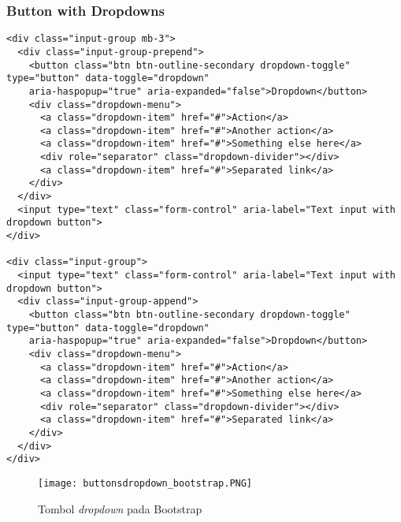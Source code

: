 \subsubsection{Button with Dropdowns}
\begin{lstlisting}[frame=single, basicstyle=\tiny]
<div class="input-group mb-3">
  <div class="input-group-prepend">
    <button class="btn btn-outline-secondary dropdown-toggle" type="button" data-toggle="dropdown"
    aria-haspopup="true" aria-expanded="false">Dropdown</button>
    <div class="dropdown-menu">
      <a class="dropdown-item" href="#">Action</a>
      <a class="dropdown-item" href="#">Another action</a>
      <a class="dropdown-item" href="#">Something else here</a>
      <div role="separator" class="dropdown-divider"></div>
      <a class="dropdown-item" href="#">Separated link</a>
    </div>
  </div>
  <input type="text" class="form-control" aria-label="Text input with dropdown button">
</div>

<div class="input-group">
  <input type="text" class="form-control" aria-label="Text input with dropdown button">
  <div class="input-group-append">
    <button class="btn btn-outline-secondary dropdown-toggle" type="button" data-toggle="dropdown"
    aria-haspopup="true" aria-expanded="false">Dropdown</button>
    <div class="dropdown-menu">
      <a class="dropdown-item" href="#">Action</a>
      <a class="dropdown-item" href="#">Another action</a>
      <a class="dropdown-item" href="#">Something else here</a>
      <div role="separator" class="dropdown-divider"></div>
      <a class="dropdown-item" href="#">Separated link</a>
    </div>
  </div>
</div>
\end{lstlisting}

\begin{figure} [H]
	\centering  
	\texttt{[image: buttonsdropdown\_bootstrap.PNG]}  
	\caption{Tombol \textit{dropdown} pada Bootstrap} 
\end{figure}

